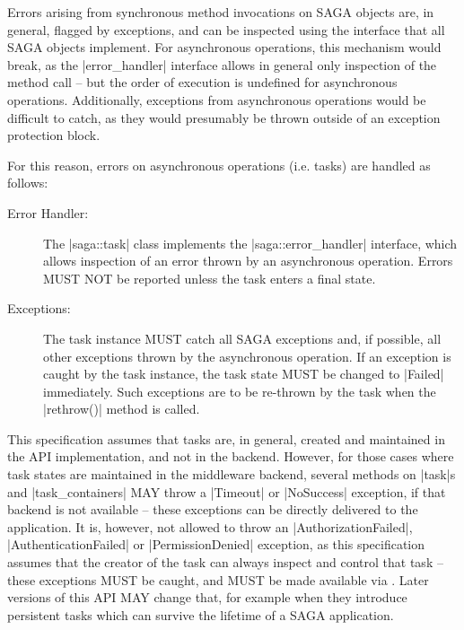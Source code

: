   Errors arising from synchronous method invocations on SAGA
  objects are, in general, flagged by exceptions, and can be
  inspected using the  interface that all
  SAGA objects implement.  For asynchronous operations, this
  mechanism would break, as the |error_handler| interface allows
  in general only inspection of the  method call
  -- but the order of execution is undefined for asynchronous
  operations.  Additionally, exceptions from asynchronous
  operations would be difficult to catch, as they would
  presumably be thrown outside of an exception
  protection block.
 
  For this reason, errors on asynchronous operations (i.e.
  tasks) are handled as follows:
 
  \begin{description}
   
   \item[Error Handler:] The |saga::task| class implements the
   |saga::error_handler| interface, which allows inspection of
   an error thrown by an asynchronous operation.  Errors MUST
   NOT be reported unless the task enters a final state.
     
   \item[Exceptions:] The task instance MUST catch all SAGA
   exceptions and, if possible, all other exceptions thrown by
   the asynchronous operation.  If an exception is caught by the
   task instance, the task state MUST be changed to |Failed|
   immediately.  Such exceptions are to be re-thrown by the task
   when the |rethrow()| method is called.
 
  \end{description}
 
  This specification assumes that tasks are, in general, created
  and maintained in the API implementation, and not in the
  backend.  However, for those cases where task states are
  maintained in the middleware backend, several methods on
  |task|s and |task_containers| MAY throw a |Timeout| or
  |NoSuccess| exception, if that backend is not available
   -- these exceptions can be directly delivered to the
  application.  It is, however, not allowed to throw an
  |AuthorizationFailed|, |AuthenticationFailed| or
  |PermissionDenied| exception, as this specification
  assumes that the creator of the task can always inspect and
  control that task  -- these exceptions MUST be
  caught, and MUST be made available via .  Later
  versions of this API MAY change that, for example when they
  introduce persistent tasks which can survive the lifetime of a
  SAGA application.
 
